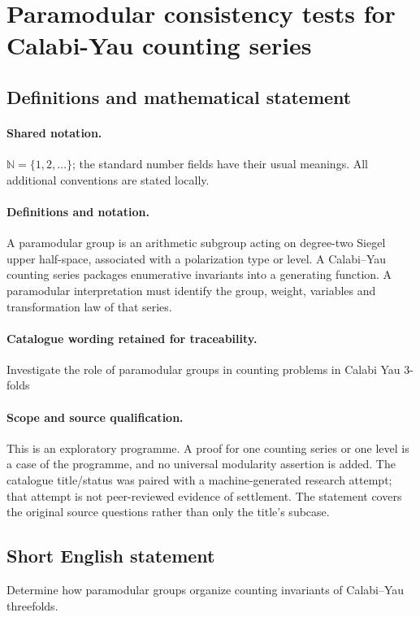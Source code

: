 \documentclass[11pt]{article}
\begin{document}
\section{Paramodular consistency tests for Calabi-Yau counting series}\label{statement}

\subsection{Definitions and mathematical statement}

\paragraph{Shared notation.}$\mathbb N=\{1,2,\ldots\}$; the standard number fields have their usual meanings. All additional conventions are stated locally.


\paragraph{Definitions and notation.}A paramodular group is an arithmetic subgroup acting on degree-two Siegel upper half-space, associated with a polarization type or level. A Calabi--Yau counting series packages enumerative invariants into a generating function. A paramodular interpretation must identify the group, weight, variables and transformation law of that series.

\paragraph{Catalogue wording retained for traceability.}
Investigate the role of paramodular groups in counting problems in Calabi Yau 3-folds
\paragraph{Scope and source qualification.}This is an exploratory programme. A proof for one counting series or one level is a case of the programme, and no universal modularity assertion is added. The catalogue title/status was paired with a machine-generated research attempt; that attempt is not peer-reviewed evidence of settlement. The statement covers the original source questions rather than only the title’s subcase.
\subsection{Short English statement}
Determine how paramodular groups organize counting invariants of Calabi–Yau threefolds.
\end{document}
